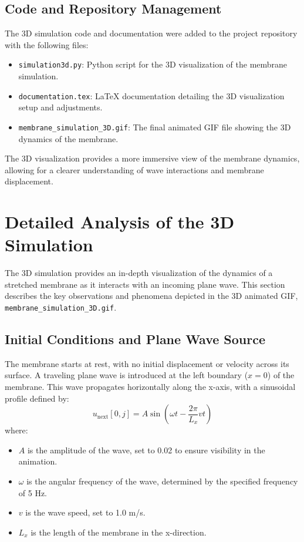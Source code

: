 \documentclass{article}
\begin{document}
\subsection{Code and Repository Management}
The 3D simulation code and documentation were added to the project repository with the following files:
\begin{itemize}
    \item \texttt{simulation3d.py}: Python script for the 3D visualization of the membrane simulation.
    \item \texttt{documentation.tex}: LaTeX documentation detailing the 3D visualization setup and adjustments.
    \item \texttt{membrane\_simulation\_3D.gif}: The final animated GIF file showing the 3D dynamics of the membrane.
\end{itemize}

The 3D visualization provides a more immersive view of the membrane dynamics, allowing for a clearer understanding of wave interactions and membrane displacement.

\section{Detailed Analysis of the 3D Simulation}

The 3D simulation provides an in-depth visualization of the dynamics of a stretched membrane as it interacts with an incoming plane wave. This section describes the key observations and phenomena depicted in the 3D animated GIF, \texttt{membrane\_simulation\_3D.gif}.

\subsection{Initial Conditions and Plane Wave Source}
The membrane starts at rest, with no initial displacement or velocity across its surface. A traveling plane wave is introduced at the left boundary ($x = 0$) of the membrane. This wave propagates horizontally along the x-axis, with a sinusoidal profile defined by:
\[
u_{\text{next}}[0, j] = A \sin\left(\omega t - \frac{2 \pi}{L_x} v t \right)
\]
where:
\begin{itemize}
    \item $A$ is the amplitude of the wave, set to 0.02 to ensure visibility in the animation.
    \item $\omega$ is the angular frequency of the wave, determined by the specified frequency of 5 Hz.
    \item $v$ is the wave speed, set to 1.0 m/s.
    \item $L_x$ is the length of the membrane in the x-direction.
\end{itemize}
\end{document}
